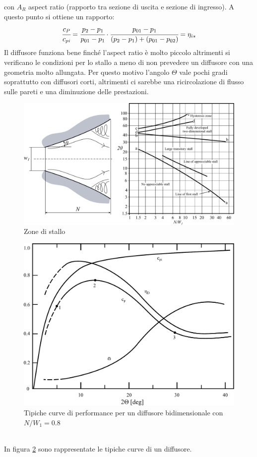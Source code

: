 con $A_R$ aspect ratio (rapporto tra sezione di uscita e sezione di ingresso). A questo punto si ottiene un rapporto:
\begin{align*}
\cfrac{c_P}{c_{pi}} = \cfrac{p_2-p_1}{p_{01}-p_1} \cdot \cfrac{p_{01}-p_1}{(p_2-p_1)+(p_{01}-p_{02})}= \eta_{is}
\end{align*}
Il diffusore funziona bene finché l'aspect ratio è molto piccolo altrimenti si verificano le condizioni per lo stallo a meno di non prevedere un diffusore con una geometria molto allungata. Per questo motivo l'angolo $\Theta$ vale pochi gradi soprattutto con diffusori corti, altrimenti ci sarebbe una ricircolazione di flusso sulle pareti e una diminuzione delle prestazioni. 
\begin{figure}
\centering
  \includegraphics[width=.7\textwidth]{fig/stallo.pdf}
\caption{Zone di stallo}
\label{fig:stallo}
\end{figure}
\begin{figure}
\centering
  \includegraphics[width=.5\textwidth]{fig/DiffPerf.pdf}
\caption{Tipiche curve di performance per un diffusore bidimensionale con $N/W_1 = 0.8$}
\label{fig:DiffPerf}
\end{figure}
\\In figura \ref{fig:DiffPerf} sono rappresentate le tipiche curve di un diffusore.
